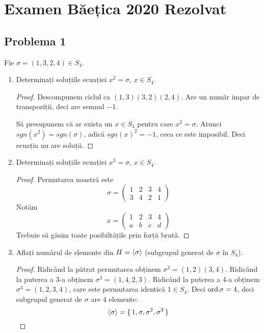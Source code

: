 \section*{Examen Băețica 2020 Rezolvat}
\subsection*{Problema 1}

Fie \(\sigma = (1, 3, 2, 4) \in S_4\).

\begin{enumerate}
    \item Determinați soluțiile ecuației \(x^2 = \sigma\), \(x \in S_4\).
    \begin{proof}
    Descompunem ciclul ca \((1, 3) (3, 2) (2, 4)\). Are un număr impar de transpoziții, deci are semnul \(-1\).

    Să presupunem că ar exista un \(x \in S_4\) pentru care \(x^2 = \sigma\). Atunci \(sgn(x^2) = sgn(\sigma)\), adică \(sgn(x)^2 = -1\), ceea ce este imposibil. Deci ecuația nu are soluții.
    \end{proof}

    \item Determinați soluțiile ecuației \(x^3 = \sigma\), \(x \in S_4\).
    \begin{proof}
    Permutarea noastră este
    \[\sigma = \begin{pmatrix}
        1 & 2 & 3 & 4 \\
        3 & 4 & 2 & 1
    \end{pmatrix}\]
    Notăm
    \[x = \begin{pmatrix}
        1 & 2 & 3 & 4 \\
        a & b & c & d
    \end{pmatrix}\]
    Trebuie să găsim toate posibiltățile prin forță brută.
    \end{proof}

    \item Aflați numărul de elemente din \(H = \left\langle \sigma \right\rangle\) (subgrupul generat de \(\sigma\) în \(S_4\)).
    \begin{proof}
    Ridicând la pătrat permutarea obținem \(\sigma^2 = (1, 2) (3, 4)\). Ridicând la puterea a 3-a obținem \(\sigma^3 = (1, 4, 2, 3)\). Ridicând la puterea a 4-a obținem \(\sigma^4 = (1, 2, 3, 4)\), care este permutarea identică \(1 \in S_4\). Deci \(\operatorname{ord} \sigma = 4\), deci subgrupul generat de \(\sigma\) are 4 elemente:
    \[\left\langle \sigma \right\rangle = \set{1, \sigma, \sigma^2, \sigma^3}\]
    \end{proof}


\end{enumerate}
